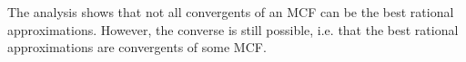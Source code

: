 



The analysis shows that not all convergents of an MCF can be the best rational
approximations.
However, the converse is still possible, i.e. that the best rational
approximations are convergents of some MCF.
